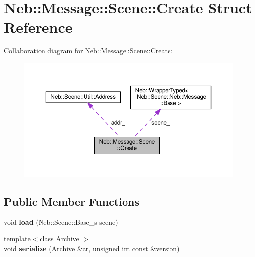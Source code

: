 \hypertarget{structNeb_1_1Message_1_1Scene_1_1Create}{\section{Neb\-:\-:Message\-:\-:Scene\-:\-:Create Struct Reference}
\label{structNeb_1_1Message_1_1Scene_1_1Create}
}


Collaboration diagram for Neb\-:\-:Message\-:\-:Scene\-:\-:Create\-:
\nopagebreak
\begin{figure}[H]
\begin{center}
\leavevmode
\includegraphics[width=350pt]{structNeb_1_1Message_1_1Scene_1_1Create__coll__graph}
\end{center}
\end{figure}
\subsection*{Public Member Functions}
\begin{DoxyCompactItemize}
\item 
\hypertarget{structNeb_1_1Message_1_1Scene_1_1Create_aa143080420fdc933e59d4a20eea745bb}{void {\bfseries load} (Neb\-::\-Scene\-::\-Base\-\_\-s scene)}\label{structNeb_1_1Message_1_1Scene_1_1Create_aa143080420fdc933e59d4a20eea745bb}

\item 
\hypertarget{structNeb_1_1Message_1_1Scene_1_1Create_ab128d0e116d07b1034ef8f25adcfa4ac}{{\footnotesize template$<$class Archive $>$ }\\void {\bfseries serialize} (Archive \&ar, unsigned int const \&version)}\label{structNeb_1_1Message_1_1Scene_1_1Create_ab128d0e116d07b1034ef8f25adcfa4ac}

\end{DoxyCompactItemize}

